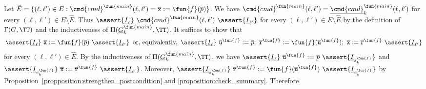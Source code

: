 Let $\hat{E} = \{ (\ell, \ell') \in E : \cmd{cmd}^\fun{main} (\ell, \ell') =
\overline{\mathtt{x}} := \fun{f} (\overline{p}) \}$. We have
$\cmd{cmd}^\fun{main} (\ell, \ell') = \underline{\cmd{cmd}}_k^\fun{main} (\ell, \ell')$ for every
$(\ell, \ell') \in E \setminus \hat{E}$. Thus $\assert{\underline{I}_{\ell}}\
\cmd{cmd}^\fun{main} (\ell, \ell')\ \assert{\underline{I}_{\ell'}}$ for every $(\ell,
\ell') \in E \setminus \hat{E}$ by the definition of $\Gamma (G,
\TT)$ and the inductiveness of $\Pi (\underline{G}^{\fun{main}}_k,
\TT)$. It suffices to show that
\begin{equation*}
  \assert{\underline{I}_{\ell}}\
  \overline{\mathtt{x}} := \fun{f} (\overline{p})
  \ \assert{\underline{I}_{\ell'}}
  \hspace{0.5em}
  \text{or, equivalently,}
  \hspace{0.5em}
  \assert{\underline{I}_{\ell}}\ 
  \overline{\mathtt{u}}^\fun{f} := \overline{p};\
  \overline{\mathtt{r}}^\fun{f} := \fun{f} (\overline{\mathtt{u}}^\fun{f});\
  \overline{\mathtt{x}} := \overline{\mathtt{r}}^\fun{f}
  \ \assert{\underline{I}_{\ell'}}
\end{equation*}
for every $(\ell, \ell') \in \hat{E}$. 
By the inductiveness of $\Pi (\underline{G}^{\fun{main}}_k, \TT)$, we have
$\assert{\underline{I}_{\ell}}\ \overline{\mathtt{u}}^\fun{f} := \overline{p}\
\assert{\underline{I}_{s_k^\fun{f}}}$ and
$\assert{\underline{I}_{e_k^\fun{f}}}\ \overline{\mathtt{x}} :=
\overline{\mathtt{r}}^\fun{f}\ \assert{\underline{I}_{\ell'}}$.
Moreover,
$\assert{\underline{I}_{s_k^\fun{f}}}\
\overline{\mathtt{r}}^\fun{f} := \fun{f}
(\overline{\mathtt{u}}^\fun{f})\ \assert{\underline{I}_{e_k^\fun{f}}}$
by Proposition~\ref{propposition:strengthen_postcondition} and \ref{proposition:check_summary}.
Therefore
\begin{prooftree}



\end{prooftree}
